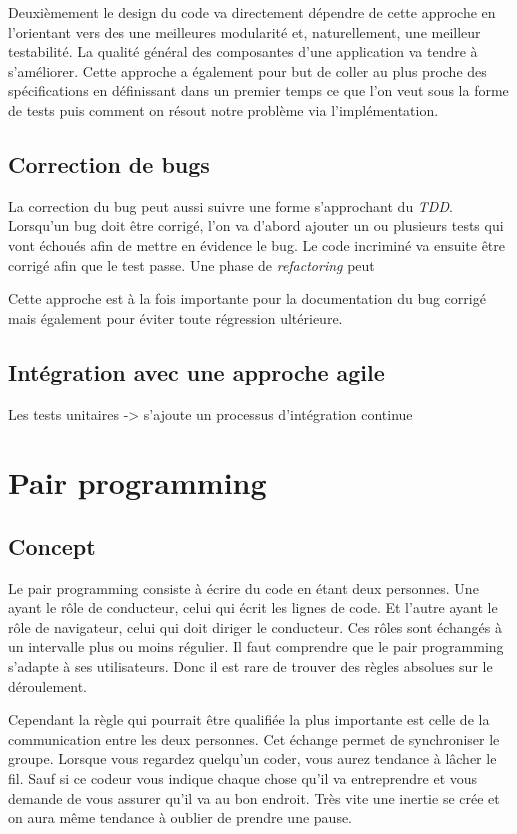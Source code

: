 \documentclass[journal, a4paper, frenchb]{IEEEtran}
\begin{document}
Deuxièmement le design du code va directement dépendre de cette approche en l'orientant vers des une meilleures modularité et, naturellement, une meilleur testabilité. La qualité général des composantes d'une application va tendre à s'améliorer. Cette approche a également pour but de coller au plus proche des spécifications en définissant dans un premier temps ce que l'on veut sous la forme de tests puis comment on résout notre problème via l'implémentation.


\subsection{Correction de bugs}

La correction du bug peut aussi suivre une forme s'approchant du \emph{TDD}. Lorsqu'un bug doit être corrigé, l'on va d'abord ajouter un ou plusieurs tests qui vont échoués afin de mettre en évidence le bug. Le code incriminé va ensuite être corrigé afin que le test passe. Une phase de \emph{refactoring} peut

Cette approche est à la fois importante pour la documentation du bug corrigé mais également pour éviter toute régression ultérieure.


\subsection{Intégration avec une approche agile}

Les tests unitaires -> s'ajoute un processus d'intégration continue



\section{Pair programming}
\subsection{Concept}
Le pair programming consiste à écrire du code en étant deux personnes. Une ayant le rôle de conducteur, celui qui écrit les lignes de code. Et l’autre ayant le rôle de navigateur, celui qui doit diriger le conducteur. Ces rôles sont échangés à un intervalle plus ou moins régulier. Il faut comprendre que le pair programming s’adapte à ses utilisateurs. Donc il est rare de trouver des règles absolues sur le déroulement.

Cependant la règle qui pourrait être qualifiée la plus importante est celle de la communication entre les deux personnes. Cet échange permet de synchroniser le groupe. Lorsque vous regardez quelqu’un coder, vous aurez tendance à lâcher le fil. Sauf si ce codeur vous indique chaque chose qu’il va entreprendre et vous demande de vous assurer qu’il va au bon endroit. Très vite une inertie se crée et on aura même tendance à oublier de prendre une pause.
\end{document}
